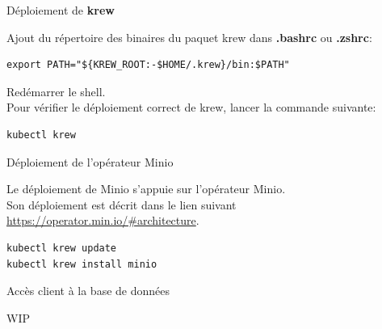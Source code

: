 
\begin{frame}[fragile]{Déploiement de \textbf{krew}}

   Ajout du répertoire des binaires du paquet krew dans \textbf{.bashrc} ou \textbf{.zshrc}:

\begin{tiny}
\begin{Verbatim}[commandchars=\&\#\#]
export PATH="${KREW_ROOT:-$HOME/.krew}/bin:$PATH"
\end{Verbatim}
\end{tiny}

Redémarrer le shell.\\
Pour vérifier le déploiement correct de krew, lancer la commande suivante:

\begin{tiny}
\begin{Verbatim}[commandchars=\&\#\#]
kubectl krew
\end{Verbatim}
\end{tiny}

\end{frame}


\begin{frame}[fragile]{Déploiement de l'opérateur Minio}

   Le déploiement de Minio s'appuie sur l'opérateur Minio.\\
   Son déploiement est décrit dans le lien suivant \url{https://operator.min.io/#architecture}.\\

\begin{tiny}
\begin{Verbatim}[commandchars=\&\#\#]
kubectl krew update
kubectl krew install minio
\end{Verbatim}
\end{tiny}


\end{frame}


\begin{frame}[fragile]{Accès client à la base de données}

   WIP

\end{frame}

